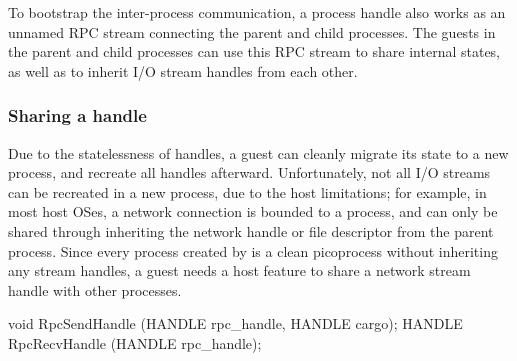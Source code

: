 

To bootstrap the inter-process communication, a process handle also works as an unnamed RPC stream connecting the parent and child processes.
The guests in the parent and child processes can use this RPC stream to share internal states,
as well as to inherit I/O stream handles from each other.







\subsubsection*{Sharing a handle}




Due to the statelessness of handles,
a guest can cleanly migrate its state to a new process, and recreate all handles afterward.
Unfortunately, not all I/O streams can be recreated
in a new process, due to the host limitations;
for example, in most host OSes, a network connection is bounded to a process,
and can only be shared through inheriting the network handle or file descriptor from the parent process.
Since every process created by  is a clean picoprocess without inheriting any stream handles,
a guest needs a host feature
to share a network stream handle with other processes.


\begin{paldef}
void   RpcSendHandle (HANDLE rpc_handle, HANDLE cargo);
HANDLE RpcRecvHandle (HANDLE rpc_handle);
\end{paldef}



